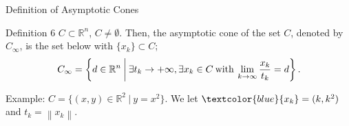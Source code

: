 \documentclass[aspectratio=169, dvipdfmx, 11pt]{beamer}
\begin{document}
\begin{frame}{Definition of Asymptotic Cones}
  \begin{block}{Definition 6}
    $C \subset \mathbb{R}^n$, $C \neq \emptyset$. Then, the asymptotic cone of the set $C$, denoted by $C_\infty$, is the set below with $\{ x_k \} \subset C$;
    \begin{equation}
      C_\infty = \left\{ d \in
      \mathbb{R}^n \:\middle|\: \exists t_k \rightarrow +\infty, \exists x_k \in C \:\text{\rm with}\: \lim_{k \to \infty} \frac{x_k}{t_k} = d \right\}. \notag
    \end{equation}
  \end{block}

  Example: $C = \{(x,y) \in \mathbb{R}^2 \:|\: y=x^2\}$. We let $\textcolor{blue}{x_k} = (k, k^2)$ and $t_k = \left\lVert x_k \right\rVert$.


\end{frame}
\end{document}
